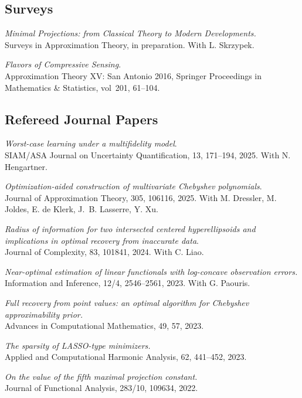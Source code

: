 \documentclass[11pt]{article}
\begin{document}
\subsection{Surveys}
\betaremune
\item {\sl Minimal Projections:
from Classical Theory to Modern Developments.}\\
Surveys in Approximation Theory, in preparation. With L. Skrzypek.
\item {\sl Flavors of Compressive Sensing}.\\
Approximation Theory XV: San Antonio 2016,
Springer Proceedings in Mathematics \& Statistics,
vol~201, 61--104. 
\eetaremune

\subsection{Refereed Journal Papers}
\betaremune
\item {\sl Worst-case learning under a multifidelity model}.\\
SIAM/ASA Journal on Uncertainty Quantification, 13, 171--194, 2025. With N. Hengartner.
\item {\sl Optimization-aided construction of multivariate Chebyshev polynomials}.\\
Journal of Approximation Theory, 305, 106116, 2025. With M.  Dressler, M.  Joldes, E. de Klerk, J.~B. Lasserre,  Y. Xu.
\item {\sl Radius of information for two intersected centered hyperellipsoids and implications in optimal recovery from inaccurate data}. \\
Journal of Complexity, 83, 101841, 2024. With C. Liao.
\item {\sl Near-optimal estimation of linear functionals with log-concave observation errors.}\\
Information and Inference, 12/4, 2546--2561, 2023.  
With G. Paouris.
\item {\sl Full recovery from point values: an optimal algorithm for Chebyshev approximability prior.}\\
Advances in Computational Mathematics,  49, 57, 2023.	
\item {\sl The sparsity of LASSO-type minimizers.}\\
Applied and Computational Harmonic Analysis, 62, 441--452, 2023.
\item {\sl On the value of the fifth maximal projection constant.}\\
Journal of Functional Analysis, 283/10, 109634, 2022.
\end{document}
